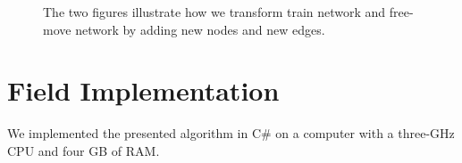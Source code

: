 \begin{figure}[!htbp]
\centering
    \hspace{15pt}
    \caption{The two figures illustrate how we transform train network and free-move network by adding new nodes and new edges.}
    \label{fig:Figure5}
\end{figure}


\section{Field Implementation}\label{sec:locomotive:implementation}

We implemented the presented algorithm in C\# on a computer with a three-GHz CPU and four GB of RAM.

